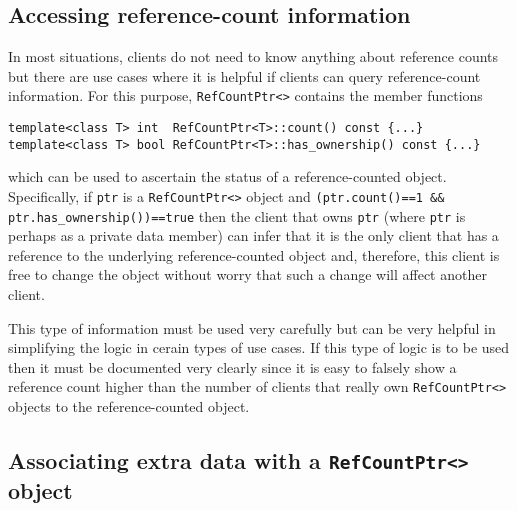 %
\subsection{Accessing reference-count information}
%

In most situations, clients do not need to know anything about
reference counts but there are use cases where it is helpful if
clients can query reference-count information.  For this purpose,
{}\texttt{RefCountPtr<>} contains the member functions
%
{\scriptsize\begin{verbatim}
template<class T> int  RefCountPtr<T>::count() const {...}
template<class T> bool RefCountPtr<T>::has_ownership() const {...}
\end{verbatim}}
%
{}\noindent{}which can be used to ascertain the status of a
reference-counted object.  Specifically, if {}\texttt{ptr} is a
{}\texttt{RefCountPtr<>} object and {}\texttt{(ptr.count()==1 \&\&
ptr.has\_ownership())==true} then the client that owns {}\texttt{ptr}
(where {}\texttt{ptr} is perhaps as a private data member) can infer
that it is the only client that has a reference to the underlying
reference-counted object and, therefore, this client is free to change
the object without worry that such a change will affect another
client.

This type of information must be used very carefully but can be very
helpful in simplifying the logic in cerain types of use cases. If this
type of logic is to be used then it must be documented very clearly
since it is easy to falsely show a reference count higher than the
number of clients that really own {}\texttt{RefCountPtr<>} objects to
the reference-counted object.

%
\subsection{Associating extra data with a {}\texttt{RefCountPtr<>} object}
\label{rcp:sec:extra-data}
%

